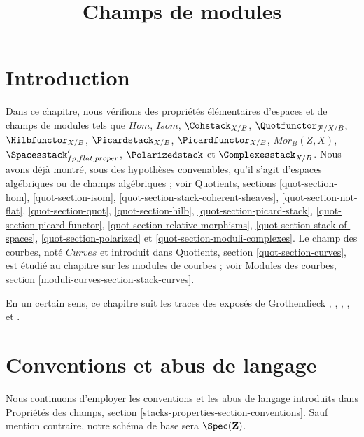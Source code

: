 

%


\title{Champs de modules}

\maketitle

\label{section-phantom}

\tableofcontents




\section{Introduction}
\label{section-introduction}

\noindent
Dans ce chapitre, nous vérifions des propriétés élémentaires d'espaces
et de champs de modules tels que
$\mathit{Hom}$, $\mathit{Isom}$, $\Cohstack_{X/B}$,
$\Quotfunctor_{\mathcal{F}/X/B}$, $\Hilbfunctor_{X/B}$,
$\Picardstack_{X/B}$, $\Picardfunctor_{X/B}$, $\mathit{Mor}_B(Z, X)$,
$\Spacesstack'_{fp, flat, proper}$, $\Polarizedstack$ et
$\Complexesstack_{X/B}$.
Nous avons déjà montré, sous des hypothèses convenables, qu'il s'agit
d'espaces algébriques ou de champs algébriques ; voir Quotients, sections
\ref{quot-section-hom},
\ref{quot-section-isom},
\ref{quot-section-stack-coherent-sheaves},
\ref{quot-section-not-flat},
\ref{quot-section-quot},
\ref{quot-section-hilb},
\ref{quot-section-picard-stack},
\ref{quot-section-picard-functor},
\ref{quot-section-relative-morphisms},
\ref{quot-section-stack-of-spaces},
\ref{quot-section-polarized} et
\ref{quot-section-moduli-complexes}.
Le champ des courbes, noté $\textit{Curves}$ et introduit dans
Quotients, section \ref{quot-section-curves}, est étudié au chapitre
sur les modules de courbes ; voir Modules des courbes, section
\ref{moduli-curves-section-stack-curves}.

\medskip\noindent
En un certain sens, ce chapitre suit les traces des exposés de
Grothendieck \cite{Gr-I},
\cite{Gr-II},
\cite{Gr-III},
\cite{Gr-IV},
\cite{Gr-V} et
\cite{Gr-VI}.






\section{Conventions et abus de langage}
\label{section-conventions}

\noindent
Nous continuons d'employer les conventions et les abus de langage
introduits dans Propriétés des champs, section
\ref{stacks-properties-section-conventions}.
Sauf mention contraire, notre schéma de base sera $\Spec(\mathbf{Z})$.






